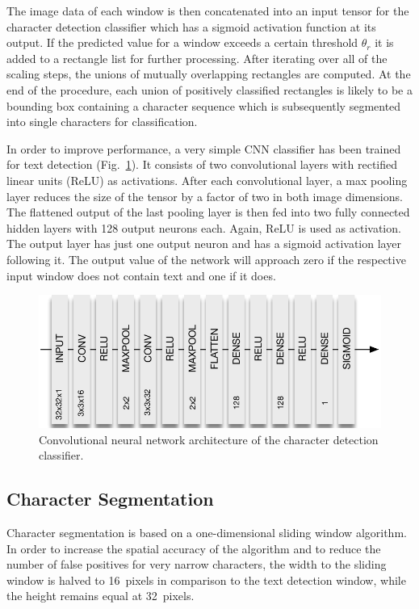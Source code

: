 \documentclass[12pt]{article}
\newcommand\figref[1]{Fig.~\ref{fig:#1}}
\begin{document}
The image data of each window is then concatenated into an input tensor for the character detection
classifier which has a sigmoid activation function at its output.
If the predicted value for a window exceeds a certain threshold $\theta_r$
it is added to a rectangle list for further processing. After iterating over all of the
scaling steps, the unions of mutually overlapping rectangles are computed.
At the end of the procedure, each union of positively classified rectangles is likely to be a bounding
box containing a character sequence which is subsequently segmented into single characters for classification.

In order to improve performance, a very simple CNN classifier has been trained for text detection (\figref{detection_cnn}).
It consists of two convolutional layers with rectified linear units (ReLU) as activations. After
each convolutional layer, a max pooling layer reduces the size of the tensor by a factor of two in
both image dimensions.
The flattened output of the last pooling layer is then fed into two fully connected hidden layers
with 128 output neurons each. Again, ReLU is used as activation. The output layer has just one
output neuron and has a sigmoid activation layer following it. The output value of the network
will approach zero if the respective input window does not contain text and one if it does.

\begin{figure}[ht]
  \centering
  \includegraphics[scale=0.75]{fig/Detection_CNN}
  \caption
  {
    Convolutional neural network architecture of the character detection classifier.
  }
  \label{fig:detection_cnn}
\end{figure}

\subsection{Character Segmentation}
\label{sec:segmentation_algorithm}
Character segmentation is based on a one-dimensional sliding window algorithm. In order to
increase the spatial accuracy of the algorithm and to reduce the number of false positives
for very narrow characters, the width to the sliding window is halved to 16~pixels in comparison
to the text detection window, while the height remains equal at 32~pixels.
\end{document}
